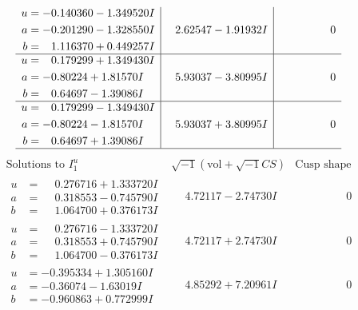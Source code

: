 \documentclass[1p]{elsarticle_modified}
\theoremstyle{definition}
\newcommand{\I}{\sqrt{-1}}
\begin{document}
$$\begin{array}{c|c|c}
\begin{aligned}
u &= -0.140360 - 1.349520 I \\
a &= -0.201290 - 1.328550 I \\
b &= \phantom{-}1.116370 + 0.449257 I\end{aligned}
 & \phantom{-}2.62547 - 1.91932 I & \phantom{-0.000000 } 0 \\ \hline\begin{aligned}
u &= \phantom{-}0.179299 + 1.349430 I \\
a &= -0.80224 + 1.81570 I \\
b &= \phantom{-}0.64697 - 1.39086 I\end{aligned}
 & \phantom{-}5.93037 - 3.80995 I & \phantom{-0.000000 } 0 \\ \hline\begin{aligned}
u &= \phantom{-}0.179299 - 1.349430 I \\
a &= -0.80224 - 1.81570 I \\
b &= \phantom{-}0.64697 + 1.39086 I\end{aligned}
 & \phantom{-}5.93037 + 3.80995 I & \phantom{-0.000000 } 0\\
 \hline 
 \end{array}$$\newpage$$\begin{array}{c|c|c}  
\text{Solutions to }I^u_{1}& \I (\text{vol} + \sqrt{-1}CS) & \text{Cusp shape}\\
 \hline 
\begin{aligned}
u &= \phantom{-}0.276716 + 1.333720 I \\
a &= \phantom{-}0.318553 - 0.745790 I \\
b &= \phantom{-}1.064700 + 0.376173 I\end{aligned}
 & \phantom{-}4.72117 - 2.74730 I & \phantom{-0.000000 } 0 \\ \hline\begin{aligned}
u &= \phantom{-}0.276716 - 1.333720 I \\
a &= \phantom{-}0.318553 + 0.745790 I \\
b &= \phantom{-}1.064700 - 0.376173 I\end{aligned}
 & \phantom{-}4.72117 + 2.74730 I & \phantom{-0.000000 } 0 \\ \hline\begin{aligned}
u &= -0.395334 + 1.305160 I \\
a &= -0.36074 - 1.63019 I \\
b &= -0.960863 + 0.772999 I\end{aligned}
 & \phantom{-}4.85292 + 7.20961 I & \phantom{-0.000000 } 0 \\ \hline\begin{aligned}

\end{aligned}
\end{array}$$
\end{document}
